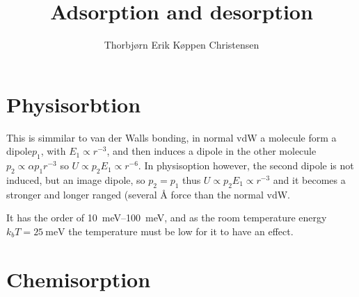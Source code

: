 \documentclass[article,oneside]{memoir}
\title{Adsorption and desorption}
\author{Thorbjørn Erik Køppen Christensen}
\begin{document}
\maketitle
\chapter{Physisorbtion}
This is simmilar to van der Walls bonding, in normal vdW a molecule form a dipole$p_1$, with $E_1\propto r^{-3}$, and then induces a dipole in the other molecule $p_2\propto \alpha p_{1}r^{-3}$ so $U\propto p_{2}E_{1}\propto r^{-6}$.
In physisoption however, the second dipole is not induced, but an image dipole, so $p_2 =p_1$ thus $U\propto p_2 E_{1}\propto r^{-3}$ and it becomes a stronger and longer ranged (several \si{\angstrom} force than the normal vdW.

It has the order of \SIrange{10}{100}{\milli\eV}, and as the room temperature energy $k_bT=\SI{25}{\milli\eV}$ the temperature must be low for it to have an effect.


\chapter{Chemisorption}
\end{document}
